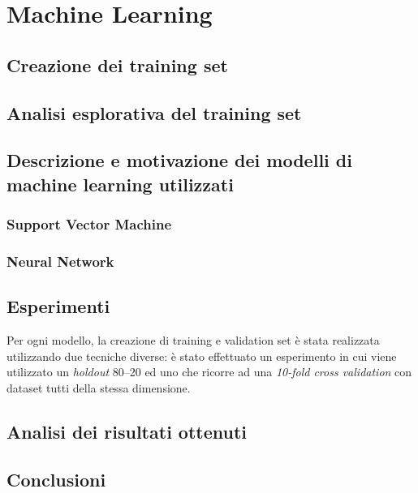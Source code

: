 \setcounter{chapter}{0}
\part{Machine Learning}
\chapter{Creazione dei training set}

\chapter{Analisi esplorativa del training set}

\chapter{Descrizione e motivazione dei modelli di machine learning utilizzati}


\section{Support Vector Machine}

\section{Neural Network}

\chapter{Esperimenti}
Per ogni modello, la creazione di training e validation set è stata realizzata 
utilizzando due tecniche diverse: è stato effettuato un esperimento in cui 
viene utilizzato un \textit{holdout} 80--20 ed uno che ricorre ad una 
\textit{10-fold cross validation} con dataset tutti della stessa dimensione.


\chapter{Analisi dei risultati ottenuti}

\chapter{Conclusioni}
